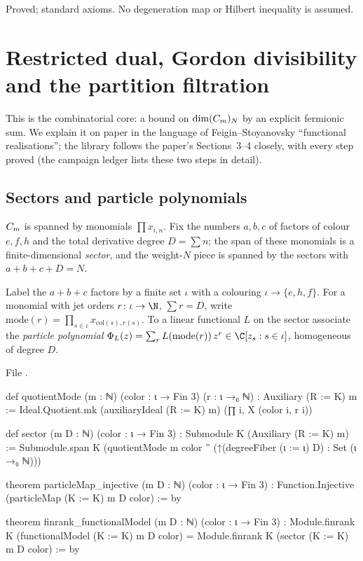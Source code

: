 \begin{status}
Proved; standard axioms. No degeneration map or Hilbert inequality is assumed.
\end{status}

\section{Restricted dual, Gordon divisibility and the partition filtration}\label{l20:sec:m23}

This is the combinatorial core: a bound on $\dim(C_m)_N$ by an explicit fermionic sum. We explain it on
paper in the language of Feigin--Stoyanovsky ``functional realisations''; the library follows the paper's
Sections~3--4 closely, with every step proved (the campaign ledger lists these two steps in detail).

\subsection{Sectors and particle polynomials}

$C_m$ is spanned by monomials $\prod x_{i,n}$. Fix the numbers $a,b,c$ of factors of colour $e,f,h$ and the
total derivative degree $D=\sum n$; the span of these monomials is a finite-dimensional \emph{sector}, and the
weight-$N$ piece is spanned by the sectors with $a+b+c+D=N$.

\begin{definition}\label{l20:def:sector}
Label the $a+b+c$ factors by a finite set $\iota$ with a colouring $\iota\to\{e,h,f\}$. For a monomial with jet
orders $r\colon\iota\to\N$, $\sum r=D$, write $\mathrm{mode}(r)=\prod_{s\in\iota}x_{\mathrm{col}(s),r(s)}$. To a linear
functional $L$ on the sector associate the \emph{particle polynomial}
$\Phi_L(z)=\sum_{r}L(\mathrm{mode}(r))\,z^r\in\C[z_s:s\in\iota]$, homogeneous of degree $D$.
\end{definition}
\noindent File .
\begin{leancode}
def quotientMode (m : ℕ) (color : ι → Fin 3) (r : ι →₀ ℕ) : Auxiliary (R := K) m :=
  Ideal.Quotient.mk (auxiliaryIdeal (R := K) m) (∏ i, X (color i, r i))

def sector (m D : ℕ) (color : ι → Fin 3) : Submodule K (Auxiliary (R := K) m) :=
  Submodule.span K (quotientMode m color '' (↑(degreeFiber (ι := ι) D) : Set (ι →₀ ℕ)))

theorem particleMap_injective (m D : ℕ) (color : ι → Fin 3) :
    Function.Injective (particleMap (K := K) m D color) := by

theorem finrank_functionalModel (m D : ℕ) (color : ι → Fin 3) :
    Module.finrank K (functionalModel (K := K) m D color) =
      Module.finrank K (sector (K := K) m D color) := by
\end{leancode}

